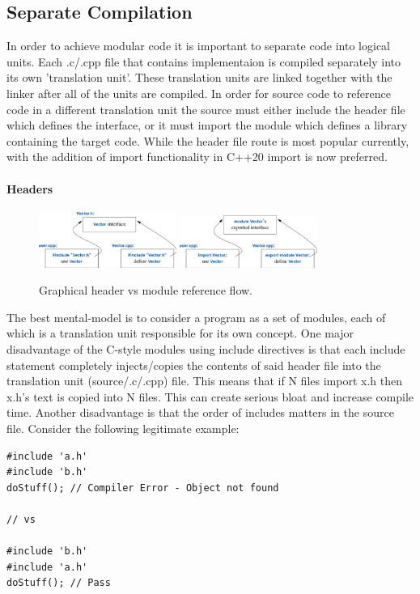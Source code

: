 \documentclass[a4paper, 10pt]{article}
\begin{document}
\subsection{Separate Compilation}
In order to achieve modular code it is important to separate code into logical units. Each .c/.cpp file that contains implementaion is compiled separately into its own 'translation unit'. These translation units are linked together with the linker after all of the units are compiled. In order for source code to reference code in a different translation unit the source must either include the header file which defines the interface, or it must import the module which defines a library containing the target code. While the header file route is most popular currently, with the addition of import functionality in C++20 import is now preferred.
\paragraph {Headers}
\begin{figure}[ht]
	\centering
	\includegraphics[width=0.4\textwidth]{images/header.png}
	\includegraphics[width=0.4\textwidth]{images/module.png}
	\caption{Graphical header vs module reference flow.}
\end{figure}
The best mental-model is to consider a program as a set of modules, each of which is a translation unit responsible for its own concept. One major disadvantage of the C-style modules using include directives is that each include statement completely injects/copies the contents of said header file into the translation unit (source/.c/.cpp) file. This means that if N files import x.h then x.h's text is copied into N files. This can create serious bloat and increase compile time. Another disadvantage is that the order of includes matters in the source file. Consider the following legitimate example:
\begin{lstlisting}[style=cpp]
#include 'a.h'
#include 'b.h'
doStuff(); // Compiler Error - Object not found

// vs

#include 'b.h'
#include 'a.h'
doStuff(); // Pass
\end{lstlisting}
\end{document}
